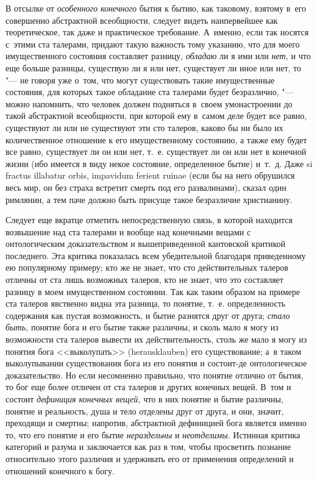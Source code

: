 В отсылке от {\em особенного конечного} бытия к бытию, как таковому, взятому
в~его совершенно абстрактной всеобщности, следует видеть наипервейшее как
теоретическое, так даже и практическое требование. А~именно, если так носятся
с~этими ста талерами, придают такую важность тому указанию, что для моего
имущественного состояния составляет разницу, {\em обладаю} ли я ими или
{\em нет,} и что еще больше разницы, существую ли я или нет, существует ли иное
или нет, то "--- не говоря уже о~том, что могут существовать такие
имущественные состояния, для которых такое обладание ста талерами будет
безразлично, "--- можно напомнить, что человек должен подняться в~своем
умонастроении до такой абстрактной всеобщности, при которой ему в~самом деле
будет все равно, существуют ли или не существуют эти сто талеров, каково бы ни
было их количественное отношение к его имущественному состоянию, а также ему
будет все равно, существует ли он или нет, т.~е. существует ли он или нет в
конечной жизни (ибо имеется в виду некое состояние, определенное бытие) и~т.~д.
Даже si fractus illabatur orbis, impavidum ferient ruinae (если бы на него
обрушился весь мир, он без страха встретит смерть под его развалинами), сказал
один римлянин, а тем паче должно быть присуще такое безразличие христианину.

Следует еще вкратце отметить непосредственную связь, в которой находится
возвышение над ста талерами и вообще над конечными вещами с онтологическим
доказательством и вышеприведенной кантовской критикой последнего. Эта критика
показалась всем убедительной благодаря приведенному ею популярному примеру; кто
же не знает, что сто действительных талеров отличны от ста лишь возможных
талеров, кто не знает, что это составляет разницу в моем имущественном
состоянии. Так как таким образом на примере ста талеров явственно видна эта
разница, то понятие, т.~е. определенность содержания как пустая возможность, и
бытие разнятся друг от друга; {\em стало быть,} понятие бога и его бытие также
различны, и сколь мало я могу из возможности ста талеров вывести их
действительность, столь же мало я могу из понятия бога <<выколупать>>
(heraus\-klau\-ben) его существование; а~в таком выколупывании существования
бога из его понятия и состоит-де онтологическое доказательство. Но если
несомненно правильно, что понятие отлично от бытия, то бог еще более
отличен от ста талеров и других конечных вещей. В~том и состоит
{\em дефиниция конечных вещей,} что в них понятие и бытие различны, понятие
и реальность, душа и тело отделены друг от друга, и они, значит, преходящи
и смертны; напротив, абстрактной дефиницией бога является именно то, что его
понятие и его бытие {\em нераздельны} и {\em неотделимы}. Истинная критика
категорий и разума и заключается как раз в том, чтобы просветить познание
относительно этого различия и удерживать его от применения определений и
отношений конечного к богу.\label{bkm:bm85b}

